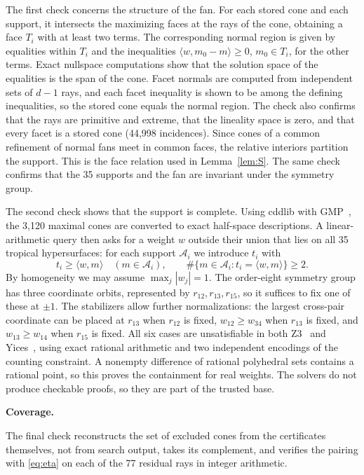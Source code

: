 \documentclass[11pt]{amsart}
\newcommand{\topic}[1]{\par\addvspace{1.4ex}\noindent\textbf{#1}\par\nobreak\smallskip\noindent}
\theoremstyle{definition}\newtheorem{definition}[theorem]{Definition}\theoremstyle{remark}\newtheorem{remark}[theorem]{Remark}
\begin{document}
The first check concerns the structure of the fan. For each stored cone and each support, it intersects the maximizing faces at the rays of the cone, obtaining a face $T_i$ with at least two terms. The corresponding normal region is given by equalities within $T_i$ and the inequalities $\langle w,m_0-m\rangle\ge0$, $m_0\in T_i$, for the other terms. Exact nullspace computations show that the solution space of the equalities is the span of the cone. Facet normals are computed from independent sets of $d-1$ rays, and each facet inequality is shown to be among the defining inequalities, so the stored cone equals the normal region. The check also confirms that the rays are primitive and extreme, that the lineality space is zero, and that every facet is a stored cone (44,998 incidences). Since cones of a common refinement of normal fans meet in common faces, the relative interiors partition the support. This is the face relation used in Lemma~\ref{lem:S}. The same check confirms that the 35 supports and the fan are invariant under the symmetry group.

The second check shows that the support is complete. Using cddlib with GMP~\citep{cdd}, the 3,120 maximal cones are converted to exact half-space descriptions. A linear-arithmetic query then asks for a weight $w$ outside their union that lies on all 35 tropical hypersurfaces: for each support $\mathcal A_i$ we introduce $t_i$ with
\[
 t_i\ge\langle w,m\rangle\quad(m\in\mathcal A_i),\qquad
 \#\{m\in\mathcal A_i:t_i=\langle w,m\rangle\}\ge2.
\]
By homogeneity we may assume $\max_j|w_j|=1$. The order-eight symmetry group has three coordinate orbits, represented by $r_{12},r_{13},r_{15}$, so it suffices to fix one of these at $\pm1$. The stabilizers allow further normalizations: the largest cross-pair coordinate can be placed at $r_{13}$ when $r_{12}$ is fixed, $w_{12}\ge w_{34}$ when $r_{13}$ is fixed, and $w_{13}\ge w_{14}$ when $r_{15}$ is fixed. All six cases are unsatisfiable in both Z3~\citep{Z3} and Yices~\citep{Yices}, using exact rational arithmetic and two independent encodings of the counting constraint. A nonempty difference of rational polyhedral sets contains a rational point, so this proves the containment for real weights. The solvers do not produce checkable proofs, so they are part of the trusted base.

\topic{Coverage.} The final check reconstructs the set of excluded cones from the certificates themselves, not from search output, takes its complement, and verifies the pairing with \eqref{eq:eta} on each of the 77 residual rays in integer arithmetic.
\end{document}
